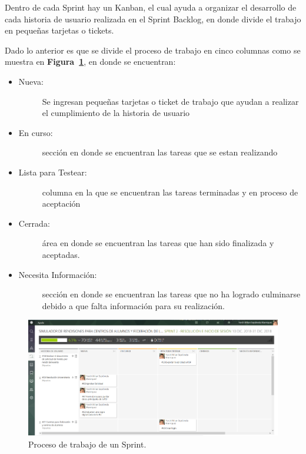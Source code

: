 Dentro de cada Sprint hay un Kanban, el cual ayuda a organizar el desarrollo de cada historia de usuario realizada en el Sprint Backlog, en donde divide el trabajo en pequeñas tarjetas o tickets.

Dado lo anterior es que se divide el proceso de trabajo en cinco columnas como se muestra en \textbf{Figura~\ref{fig: kanbanSprint}}, en donde se encuentran:

\begin{itemize}
    \item   \begin{description}
                \item[Nueva:] Se ingresan pequeñas tarjetas o ticket de trabajo que ayudan a realizar el cumplimiento de la historia de usuario 
            \end{description}

    \item   \begin{description}
                \item[En curso:] sección en donde se encuentran las tareas que se estan realizando
            \end{description}

    \item   \begin{description}
                \item[Lista para Testear:] columna en la que se encuentran las tareas terminadas y en proceso de aceptación
            \end{description}

    \item   \begin{description}
                \item[Cerrada:] área en donde se encuentran las tareas que han sido finalizada y aceptadas.
            \end{description}
    
    \item   \begin{description}
                \item[Necesita Información:] sección en donde se encuentran las tareas que no ha logrado culminarse debido a que falta información para su realización.
            \end{description}
\end{itemize}

\begin{figure}[h!]
    \includegraphics[width=\textwidth]{Imagenes/Kanban.png}
    \caption{\label{fig: kanbanSprint} Proceso de trabajo de un Sprint.}
\end{figure}
